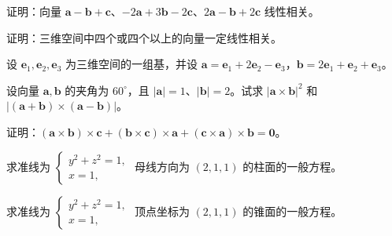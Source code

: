 \noindent\begin{minipage}{\textwidth}
证明：向量 $\boldsymbol a-\boldsymbol b+\boldsymbol c$、$-2\boldsymbol a+3\boldsymbol b-2\boldsymbol c$、$2\boldsymbol a-\boldsymbol b+2\boldsymbol c$ 线性相关。
\end{minipage}\par\vfill
\noindent\begin{minipage}{\textwidth}
证明：三维空间中四个或四个以上的向量一定线性相关。
\end{minipage}\par\vfill
\noindent\begin{minipage}{\textwidth}
设 $\boldsymbol e_1,\boldsymbol e_2,\boldsymbol e_3$ 为三维空间的一组基，并设 $\boldsymbol a=\boldsymbol e_1+2\boldsymbol e_2-\boldsymbol e_3$，$\boldsymbol b=2\boldsymbol e_1+\boldsymbol e_2+\boldsymbol e_3$。
\end{minipage}\par\vfill
\newpage
\noindent\begin{minipage}{\textwidth}
设向量 $\boldsymbol a,\boldsymbol b$ 的夹角为 $60^\circ$，且 $|\boldsymbol a|=1$、$|\boldsymbol b|=2$。试求 $|\boldsymbol a\times\boldsymbol b|^2$ 和 $|(\boldsymbol a+\boldsymbol b)\times(\boldsymbol a-\boldsymbol b)|$。
\end{minipage}\par\vfill
\noindent\begin{minipage}{\textwidth}
证明：$(\boldsymbol a\times\boldsymbol b)\times\boldsymbol c+(\boldsymbol b\times\boldsymbol c)\times\boldsymbol a+(\boldsymbol c\times\boldsymbol a)\times\boldsymbol b=\boldsymbol0$。
\end{minipage}\par\vfill
\noindent\begin{minipage}{\textwidth}
求准线为 $\begin{cases}y^2+z^2=1,\\x=1,\end{cases}$ 母线方向为 $(2,1,1)$ 的柱面的一般方程。
\end{minipage}\par\vfill
\noindent\begin{minipage}{\textwidth}
求准线为 $\begin{cases}y^2+z^2=1,\\x=1,\end{cases}$ 顶点坐标为 $(2,1,1)$ 的锥面的一般方程。
\end{minipage}\par\vfill

